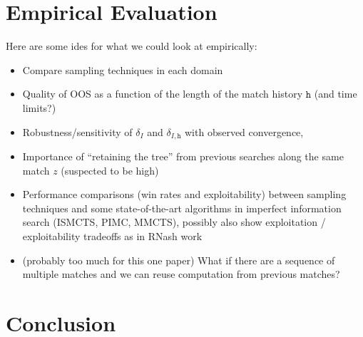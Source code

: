 \documentclass[letterpaper]{article}
\newcommand{\tth}{\mathtt{h}}
\begin{document}
\section{Empirical Evaluation}

Here are some ides for what we could look at empirically: 

\begin{itemize}
\item Compare sampling techniques in each domain
\item Quality of OOS as a function of the length of the match history $\tth$ (and time limits?)
\item Robustness/sensitivity of $\delta_I$ and $\delta_{I,\tth}$ with observed convergence,
\item Importance of ``retaining the tree'' from previous searches along the same match $z$ (suspected to be high)
\item Performance comparisons (win rates and exploitability) between sampling techniques and some state-of-the-art
algorithms in imperfect information search (ISMCTS, PIMC, MMCTS), 
possibly also show exploitation / exploitability tradeoffs as in RNash work
\item (probably too much for this one paper) What if there are a sequence of multiple matches and we can reuse computation from 
previous matches? 
\end{itemize}


\section{Conclusion}





\end{document}
